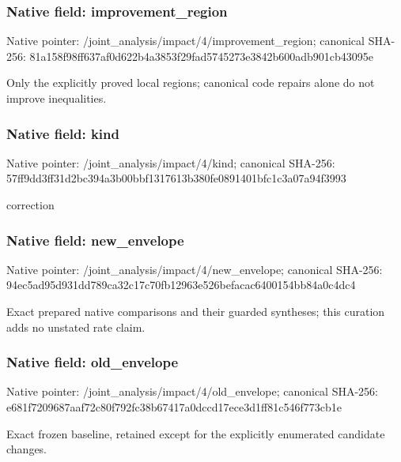 \documentclass[10pt,a4paper]{article}
\begin{document}
\subsubsection{Native field: improvement\_\allowbreak{}region}
Native pointer: /joint\_\allowbreak{}analysis/impact/4/improvement\_\allowbreak{}region; canonical SHA-256: 81a158f98ff637af0d622b4a3853f29fad5745273e3842b600adb901cb43095e

\begingroup\raggedright\sloppy Only the explicitly proved local regions;\allowbreak{} canonical code repairs alone do not improve inequalities.\par\endgroup

\subsubsection{Native field: kind}
Native pointer: /joint\_\allowbreak{}analysis/impact/4/kind; canonical SHA-256: 57ff9dd3ff31d2bc394a3b00bbf1317613b380fe0891401bfc1c3a07a94f3993

\begingroup\raggedright\sloppy correction\par\endgroup

\subsubsection{Native field: new\_\allowbreak{}envelope}
Native pointer: /joint\_\allowbreak{}analysis/impact/4/new\_\allowbreak{}envelope; canonical SHA-256: 94ec5ad95d931dd789ca32c17c70fb12963e526befacac6400154bb84a0c4dc4

\begingroup\raggedright\sloppy Exact prepared native comparisons and their guarded syntheses;\allowbreak{} this curation adds no unstated rate claim.\par\endgroup

\subsubsection{Native field: old\_\allowbreak{}envelope}
Native pointer: /joint\_\allowbreak{}analysis/impact/4/old\_\allowbreak{}envelope; canonical SHA-256: e681f7209687aaf72c80f792fc38b67417a0dccd17ece3d1ff81c546f773cb1e

\begingroup\raggedright\sloppy Exact frozen baseline,\allowbreak{} retained except for the explicitly enumerated candidate changes.\par\endgroup
\end{document}
